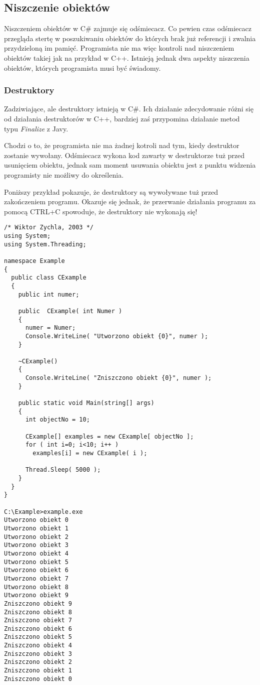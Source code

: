 \subsection{Niszczenie obiektów}

Niszczeniem obiektów w C\# zajmuje się odśmiecacz. Co pewien czas odśmiecacz przegląda stertę w poszukiwaniu
obiektów do których brak już referencji i zwalnia przydzieloną im pamięć. Programista nie ma więc kontroli
nad niszczeniem obiektów takiej jak na przykład w C++. Istnieją jednak dwa aspekty niszczenia obiektów, 
których programista musi być świadomy.

\subsubsection{Destruktory}

Zadziwiające, ale destruktory istnieją w C\#. Ich działanie zdecydowanie różni się od działania
destruktorów w C++, bardziej zaś przypomina działanie metod typu {\em Finalize} z Javy.

Chodzi o to, że programista nie ma żadnej kotroli nad tym, kiedy destruktor zostanie wywołany. 
Odśmiecacz wykona kod zawarty w destruktorze tuż przed usunięciem obiektu, jednak sam moment usuwania
obiektu jest z punktu widzenia programisty nie możliwy do określenia. 

Poniższy przykład pokazuje, że destruktory są wywoływane tuż przed zakończeniem programu. Okazuje się jednak, że
przerwanie działania programu za pomocą CTRL+C spowoduje, że destruktory nie wykonają się!


\begin{scriptsize}
\begin{verbatim}
/* Wiktor Zychla, 2003 */
using System;
using System.Threading;

namespace Example
{
  public class CExample
  {
    public int numer;

    public  CExample( int Numer )
    {
      numer = Numer;
      Console.WriteLine( "Utworzono obiekt {0}", numer );
    }

    ~CExample()
    {
      Console.WriteLine( "Zniszczono obiekt {0}", numer );
    }

    public static void Main(string[] args)
    {
      int objectNo = 10;
      
      CExample[] examples = new CExample[ objectNo ];
      for ( int i=0; i<10; i++ )
        examples[i] = new CExample( i ); 

      Thread.Sleep( 5000 );
    }
  }
}

C:\Example>example.exe
Utworzono obiekt 0
Utworzono obiekt 1
Utworzono obiekt 2
Utworzono obiekt 3
Utworzono obiekt 4
Utworzono obiekt 5
Utworzono obiekt 6
Utworzono obiekt 7
Utworzono obiekt 8
Utworzono obiekt 9
Zniszczono obiekt 9
Zniszczono obiekt 8
Zniszczono obiekt 7
Zniszczono obiekt 6
Zniszczono obiekt 5
Zniszczono obiekt 4
Zniszczono obiekt 3
Zniszczono obiekt 2
Zniszczono obiekt 1
Zniszczono obiekt 0
\end{verbatim}
\end{scriptsize}

